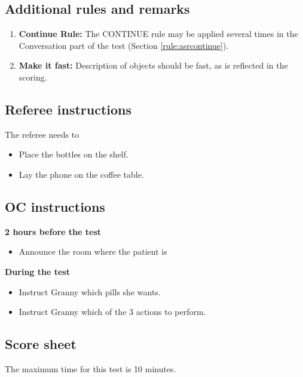 \begin{enumerate}
\subsection{Additional rules and remarks}
\begin{enumerate}
\item \textbf{Continue Rule:} The CONTINUE rule may be applied several times in the Conversation part of the test (Section \ref{rule:asrcontinue}).
\item \textbf{Make it fast:} Description of objects should be fast, as is reflected in the scoring.
\end{enumerate}

\subsection{Referee instructions}

The referee needs to
\begin{itemize}
\item Place the bottles on the shelf.
\item Lay the phone on the coffee table.
\end{itemize}

\subsection{OC instructions}

\textbf{2 hours before the test}
\begin{itemize}
\item Announce the room where the patient is
\end{itemize}
\textbf{During the test}
\begin{itemize}
\item Instruct Granny which pills she wants.
\item Instruct Granny which of the 3 actions to perform.
\end{itemize}

\subsection{Score sheet}

The maximum time for this test is 10 minutes.


\end{enumerate}
